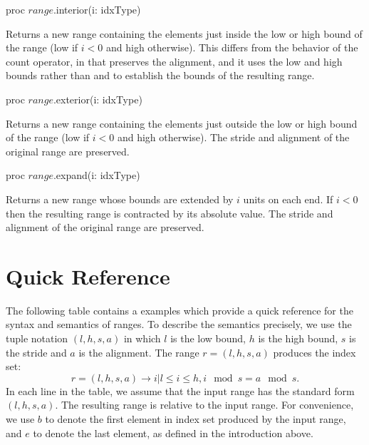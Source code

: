 \begin{protohead}
proc $range$.interior(i: idxType)
\end{protohead}
\begin{protobody}
Returns a new range containing the elements just inside the low or high bound of
the range (low if $i < 0$ and high otherwise).
This differs from the behavior of the count operator, in that 
preserves the alignment, and it uses the low and high bounds rather
than  and  to establish the bounds of the resulting range.
\end{protobody}

\begin{protohead}
proc $range$.exterior(i: idxType)
\end{protohead}
\begin{protobody}
Returns a new range containing the elements just outside the low or high bound of
the range (low if $i < 0$ and high otherwise).  The stride and alignment of the
original range are preserved.
\end{protobody}

\begin{protohead}
proc $range$.expand(i: idxType)
\end{protohead}
\begin{protobody}
Returns a new range whose bounds are extended by $i$ units on each end.  If $i <
0$ then the resulting range is contracted by its absolute value.
The stride and alignment of the original range are preserved.
\end{protobody}

\begin{protohead}
\end{protohead}
\begin{protobody}
\end{protobody}

\section{Quick Reference}

The following table contains a examples which provide a quick reference for the
syntax and semantics of ranges.  To describe the semantics precisely, we use the
tuple notation $(l, h, s, a)$ in which $l$ is the low bound, $h$ is the high
bound, $s$ is the stride and $a$ is the alignment.  The range $r = (l, h, s, a)$
produces the index set:
\begin{equation}
r = (l, h, s, a) \rightarrow {i | l \le i \le h, i \mod s = a \mod s}.
\end{equation}
\noindent In each line in the table, we assume that the input range has the
standard form $(l, h, s, a)$.  The resulting range is relative to the input
range.  For convenience, we use $b$ to denote the first element in index set
produced by the input range, and $e$ to denote the last element, as defined in
the introduction above.

